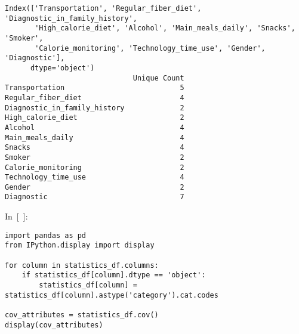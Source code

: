 \documentclass[
  english,
]{article}
\begin{document}
\begin{verbatim}
Index(['Transportation', 'Regular_fiber_diet', 'Diagnostic_in_family_history',
       'High_calorie_diet', 'Alcohol', 'Main_meals_daily', 'Snacks', 'Smoker',
       'Calorie_monitoring', 'Technology_time_use', 'Gender', 'Diagnostic'],
      dtype='object')
                              Unique Count
Transportation                           5
Regular_fiber_diet                       4
Diagnostic_in_family_history             2
High_calorie_diet                        2
Alcohol                                  4
Main_meals_daily                         4
Snacks                                   4
Smoker                                   2
Calorie_monitoring                       2
Technology_time_use                      4
Gender                                   2
Diagnostic                               7
\end{verbatim}

In~{[}~{]}:

\begin{verbatim}
import pandas as pd
from IPython.display import display

for column in statistics_df.columns:
    if statistics_df[column].dtype == 'object':
        statistics_df[column] = statistics_df[column].astype('category').cat.codes

cov_attributes = statistics_df.cov()
display(cov_attributes)
\end{verbatim}
\end{document}
